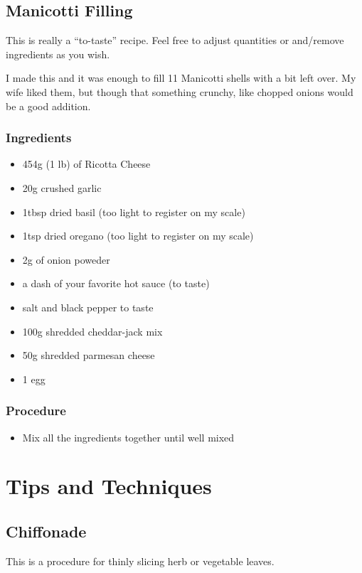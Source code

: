 \documentclass[10pt, openany]{book}
\begin{document}
\section{Manicotti Filling}
\label{extra:ManicottFilling}
This is really a ``to-taste'' recipe.  Feel free to adjust quantities or and/remove ingredients as you wish.

I made this and it was enough to fill 11 Manicotti shells with a bit left over.  My wife liked them, but though that something crunchy, like chopped onions would be a good addition.

\subsection{Ingredients}
\begin{itemize}
  \item 454g (1 lb) of Ricotta Cheese
  \item 20g crushed garlic
  \item 1tbsp dried basil (too light to register on my scale)
  \item 1tsp dried oregano (too light to register on my scale)
  \item 2g of onion poweder
  \item a dash of your favorite hot sauce (to taste)
  \item salt and black pepper to taste
  \item 100g shredded cheddar-jack mix
  \item 50g shredded parmesan cheese
  \item 1 egg
\end{itemize}
\subsection{Procedure}
\begin{itemize}
  \item Mix all the ingredients together until well mixed
\end{itemize}
\chapter{Tips and Techniques}

\section{Chiffonade}
\label{tip:Chiffonade}
This is a procedure for thinly slicing herb or vegetable leaves.
\end{document}
